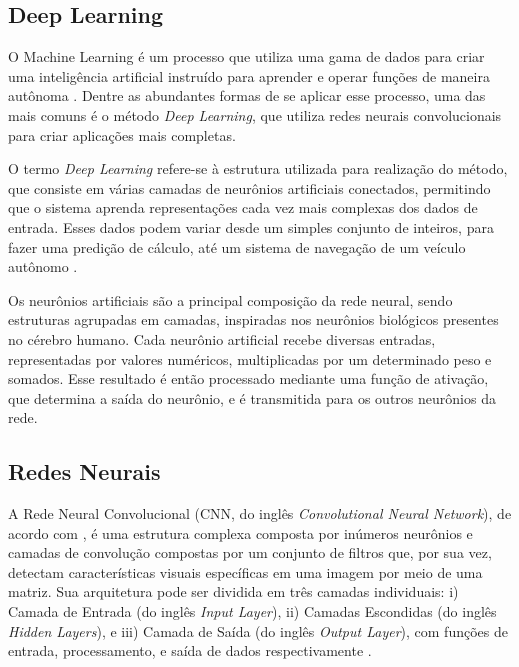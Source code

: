 
\subsection{\esp Deep Learning} \label{deeplearning}

O Machine Learning é um processo que utiliza uma gama de dados para criar uma inteligência artificial instruído para aprender e operar funções de maneira autônoma \cite{machinelearning}. Dentre as abundantes formas de se aplicar esse processo, uma das mais comuns é o método \textit{Deep Learning}, que utiliza redes neurais convolucionais para criar aplicações mais completas. 


O termo \textit{Deep Learning} refere-se à estrutura utilizada para realização do método, que consiste em várias camadas de neurônios artificiais conectados, permitindo que o sistema aprenda representações cada vez mais complexas dos dados de entrada. Esses dados podem variar desde um simples conjunto de inteiros, para fazer uma predição de cálculo, até um sistema de navegação de um veículo autônomo \cite{deeplearning}.

Os neurônios artificiais são a principal composição da rede neural, sendo estruturas agrupadas em camadas, inspiradas nos neurônios biológicos presentes no cérebro humano. Cada neurônio artificial recebe diversas entradas, representadas por valores numéricos, multiplicadas por um determinado peso e somados. Esse resultado é então processado mediante uma função de ativação, que determina a saída do neurônio, e é transmitida para os outros neurônios da rede.




\subsection{\esp Redes Neurais} \label{redesneurais}


A Rede Neural Convolucional  (CNN, do inglês \textit{Convolutional Neural Network}), de acordo com , é uma estrutura complexa composta por inúmeros neurônios e camadas de convolução compostas por um conjunto de filtros que, por sua vez, detectam características visuais específicas em uma imagem por meio de uma matriz. Sua arquitetura pode ser dividida em três camadas individuais: i) Camada de Entrada (do inglês \textit{Input Layer}), ii) Camadas Escondidas (do inglês \textit{Hidden Layers}), e iii) Camada de Saída (do inglês \textit{Output Layer}), com funções de entrada, processamento, e saída de dados respectivamente \cite{medical}.


